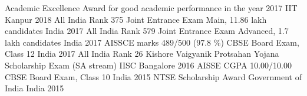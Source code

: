 
\begin{cvhonors}
  \cvhonor
    {Academic Excellence Award}
    {for good academic performance in the year 2017}
    {IIT Kanpur}
    {2018}
  \cvhonor
    {All India Rank 375}
    {Joint Entrance Exam Main, 11.86 lakh candidates}
    {India}
    {2017}
  \cvhonor
    {All India Rank 579}
    {Joint Entrance Exam Advanced, 1.7 lakh candidates}
    {India}
    {2017}
  \cvhonor
    {AISSCE marks 489/500  (97.8 \%)}
    {CBSE Board Exam, Class 12}
    {India}
    {2017}
  \cvhonor
    {All India Rank 26}
    {Kishore Vaigyanik Protsahan Yojana Scholarship Exam (SA stream)}
    {IISC Bangalore}
    {2016}
  \cvhonor
    {AISSE CGPA 10.00/10.00}
    {CBSE Board Exam, Class 10}
    {India}
    {2015}
  \cvhonor
    {NTSE Scholarship Award}
    {Government of India}
    {India}
    {2015}
\end{cvhonors}